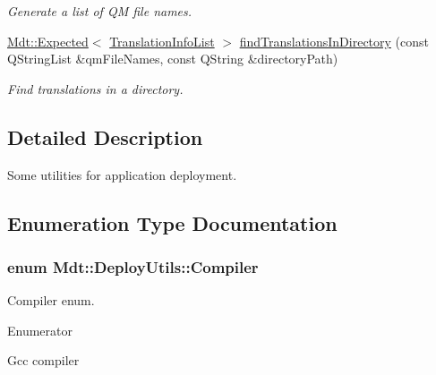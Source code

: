\begin{DoxyCompactItemize}
\begin{DoxyCompactList}\small\item\em Generate a list of QM file names. \end{DoxyCompactList}\item 
\hyperlink{class_mdt_1_1_expected}{Mdt\+::\+Expected}$<$ \hyperlink{class_mdt_1_1_translation_1_1_translation_info_list}{Translation\+Info\+List} $>$ \hyperlink{namespace_mdt_1_1_deploy_utils_aa37710e4950b619e66fb9148f90aa040}{find\+Translations\+In\+Directory} (const Q\+String\+List \&qm\+File\+Names, const Q\+String \&directory\+Path)\hypertarget{namespace_mdt_1_1_deploy_utils_aa37710e4950b619e66fb9148f90aa040}{}\label{namespace_mdt_1_1_deploy_utils_aa37710e4950b619e66fb9148f90aa040}

\begin{DoxyCompactList}\small\item\em Find translations in a directory. \end{DoxyCompactList}\end{DoxyCompactItemize}


\subsection{Detailed Description}
Some utilities for application deployment. 

\subsection{Enumeration Type Documentation}
\subsubsection[{\texorpdfstring{Compiler}{Compiler}}]{\setlength{\rightskip}{0pt plus 5cm}enum {\bf Mdt\+::\+Deploy\+Utils\+::\+Compiler}\hspace{0.3cm}{\ttfamily [strong]}}\hypertarget{namespace_mdt_1_1_deploy_utils_aabc55fa0829b602f94e42f55f66173e3}{}\label{namespace_mdt_1_1_deploy_utils_aabc55fa0829b602f94e42f55f66173e3}


Compiler enum. 

\begin{Desc}
\item[Enumerator]\par
\begin{description}
\item[{\em 
Gcc\hypertarget{namespace_mdt_1_1_deploy_utils_aabc55fa0829b602f94e42f55f66173e3aedfa57e7c7b4dd9a9d4a55087e5ac1a9}{}\label{namespace_mdt_1_1_deploy_utils_aabc55fa0829b602f94e42f55f66173e3aedfa57e7c7b4dd9a9d4a55087e5ac1a9}
}]Gcc compiler \end{description}
\end{Desc}


